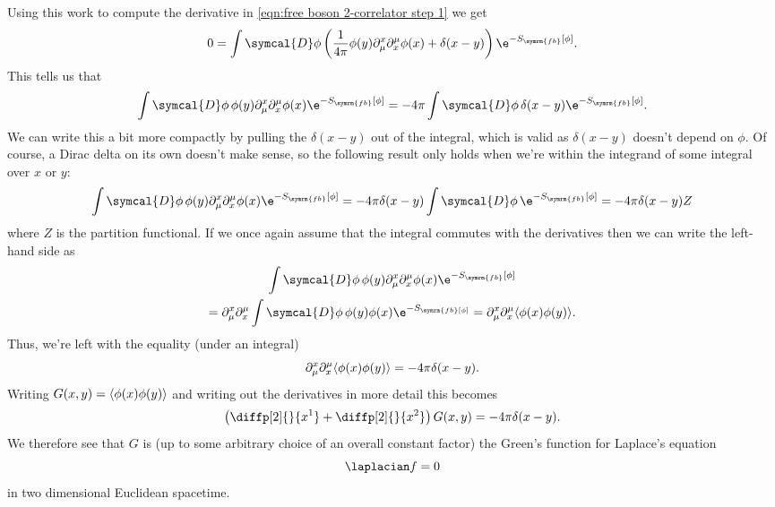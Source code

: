 \documentclass[fleqn]{NotesClass}
\newcommand{\DL}{\symcal{D}}
\DeclarePairedDelimiter{\correlator}{\langle}{\rangle}
\newcommand{\freeboson}{\symrm{fb}}
\begin{document}
    Using this work to compute the derivative in \cref{eqn:free boson 2-correlator step 1} we get
    \begin{equation}
        0 = \int \DL\phi \left( \frac{1}{4\pi} \phi(y) \partial_\mu^x\partial^\mu_x\phi(x) + \delta(x - y) \right) \e^{-S_{\freeboson}[\phi]}.
    \end{equation}
    This tells us that
    \begin{equation}
        \int \DL\phi \,\phi(y) \partial_\mu^x\partial^\mu_x\phi(x) \e^{-S_{\freeboson}[\phi]} = -4\pi \int \DL\phi \, \delta(x - y) \e^{-S_{\freeboson}[\phi]}.
    \end{equation}
    We can write this a bit more compactly by pulling the \(\delta(x - y)\) out of the integral, which is valid as \(\delta(x - y)\) doesn't depend on \(\phi\).
    Of course, a Dirac delta on its own doesn't make sense, so the following result only holds when we're within the integrand of some integral over \(x\) or \(y\):
    \begin{equation}
        \int \DL\phi \, \phi(y) \partial_\mu^x \partial^\mu_x\phi(x) \e^{-S_{\freeboson}[\phi]} = -4\pi \delta(x - y) \int \DL\phi \, \e^{-S_{\freeboson}[\phi]} = -4\pi\delta(x - y) Z
    \end{equation}
    where \(Z\) is the partition functional.
    If we once again assume that the integral commutes with the derivatives then we can write the left-hand side as
    \begin{multline}
        \int \DL\phi \, \phi(y) \partial_\mu^x \partial^\mu_x \phi(x) \e^{-S_{\freeboson}[\phi]}\\
        = \partial_\mu^x \partial^\mu_x \int \DL\phi \, \phi(y)\phi(x) \e^{-S_{\freeboson[\phi]}} = \partial_\mu^x\partial^\mu_x \correlator{\phi(x)\phi(y)}.
    \end{multline}
    Thus, we're left with the equality (under an integral)
    \begin{equation}\label{eqn:correlator as greens function}
        \partial_\mu^x\partial^\mu_x\correlator{\phi(x)\phi(y)} = -4\pi\delta(x - y).
    \end{equation}
    Writing \(G(x, y) = \correlator{\phi(x)\phi(y)}\) and writing out the derivatives in more detail this becomes
    \begin{equation}
        \left( \diffp[2]{}{x^1} + \diffp[2]{}{x^2} \right) G(x, y) = -4\pi\delta(x - y).
    \end{equation}
    We therefore see that \(G\) is (up to some arbitrary choice of an overall constant factor) the Green's function for Laplace's equation
    \begin{equation}
        \laplacian f = 0
    \end{equation}
    in two dimensional Euclidean spacetime.
    
\end{document}
